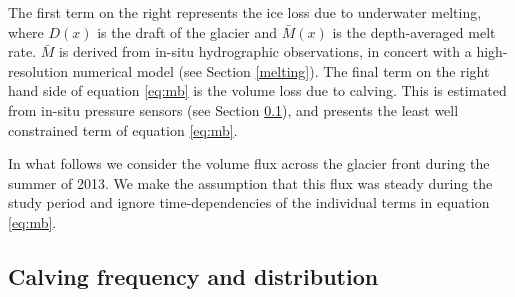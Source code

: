 \documentclass[10pt,letterpaper]{article}
\begin{document}


 The first term on the right represents the ice loss due to underwater melting, where $D(x)$ is the draft of the glacier and $\bar{M}(x)$ is the depth-averaged melt rate. $\bar{M}$ is derived from in-situ hydrographic observations, in concert with a high-resolution numerical model (see Section \ref{melting}). The final term on the right hand side of equation \eqref{eq:mb} is the volume loss due to calving. This is estimated from in-situ pressure sensors (see Section \ref{calving}), and presents the least well constrained term of equation \eqref{eq:mb}.

In what follows we consider the volume flux across the glacier front during the summer of 2013. We make the assumption that this flux was steady during the study period and ignore time-dependencies of the individual terms in equation \eqref{eq:mb}.

\subsection{Calving frequency and distribution} \label{calving}
\end{document}
